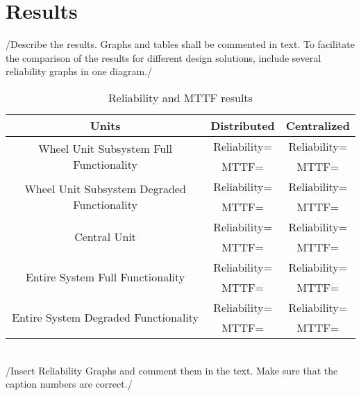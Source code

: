 \newpage
\section{Results}
/{Describe the results. Graphs and tables shall be commented in text. To facilitate the comparison of the results for different design solutions, include several reliability graphs in one diagram.}/
\begin{table}[h]
\centering
\begin{tabular}{| c | c | c |}
\hline
Units&Distributed&Centralized\\
\hline
\multirow{2}{*}{Wheel Unit Subsystem Full Functionality} & Reliability= &Reliability= \\
 & MTTF= & MTTF= \\
\hline
\multirow{2}{*}{Wheel Unit Subsystem Degraded Functionality}& Reliability= &Reliability= \\
 & MTTF= & MTTF= \\
\hline
\multirow{2}{*}{Central Unit}& Reliability= &Reliability= \\
 & MTTF= & MTTF= \\
\hline
\multirow{2}{*}{Entire System Full Functionality}& Reliability= &Reliability= \\
 & MTTF= & MTTF= \\
\hline
\multirow{2}{*}{Entire System Degraded Functionality}& Reliability= &Reliability= \\
 & MTTF= & MTTF= \\
\hline
\end{tabular}
\caption{Reliability and MTTF results}
\label{tab:Put a Lable}
\end{table}
\\/{Insert Reliability Graphs and comment them in the text. Make sure that the caption numbers are correct.}/